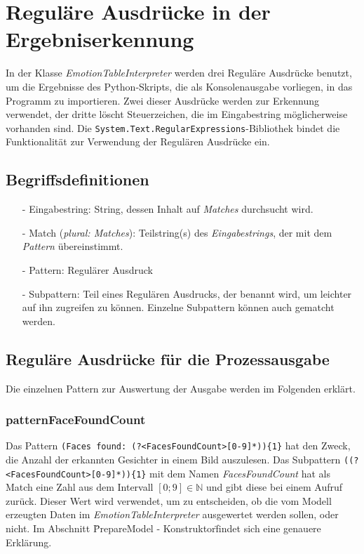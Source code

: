 \documentclass[10pt,a4paper]{report}
\begin{document}
\section{Reguläre Ausdrücke in der Ergebniserkennung}
In der Klasse \textit{EmotionTableInterpreter} werden drei Reguläre Ausdrücke benutzt, um die Ergebnisse des Python-Skripts, die als Konsolenausgabe vorliegen, in das Programm zu importieren. Zwei dieser Ausdrücke werden zur Erkennung verwendet, der dritte löscht Steuerzeichen, die im Eingabestring möglicherweise vorhanden sind. Die \texttt{System.Text.RegularExpressions}-Bibliothek bindet die Funktionalität zur Verwendung der Regulären Ausdrücke ein.
\subsection{Begriffsdefinitionen}
\begin{itemize}
\item[-] Eingabestring: String, dessen Inhalt auf \textit{Matches} durchsucht wird.
\item[-] Match (\textit{plural: Matches}): Teilstring(s) des \textit{Eingabestrings}, der mit dem \textit{Pattern} übereinstimmt.
\item[-] Pattern: Regulärer Ausdruck
\item[-] Subpattern: Teil eines Regulären Ausdrucks, der benannt wird, um leichter auf ihn zugreifen zu können. Einzelne Subpattern können auch gematcht werden. 
\end{itemize}
\subsection{Reguläre Ausdrücke für die Prozessausgabe}
Die einzelnen Pattern zur Auswertung der Ausgabe werden im Folgenden erklärt.
\subsubsection{patternFaceFoundCount}
Das Pattern \texttt{(Faces found:  (?<FacesFoundCount>[0-9]*))\{1\}} hat den Zweck, die Anzahl der erkannten Gesichter in einem Bild auszulesen. Das Subpattern \texttt{((?<FacesFoundCount>[0-9]*))\{1\}} mit dem Namen \textit{FacesFoundCount} hat als Match eine Zahl aus dem Intervall $\left[0;9\right] \in \mathbb{N}$ und gibt diese bei einem Aufruf zurück. Dieser Wert wird verwendet, um zu entscheiden, ob die vom Modell erzeugten Daten im \textit{EmotionTableInterpreter} ausgewertet werden sollen, oder nicht. Im Abschnitt \"PrepareModel - Konstruktor\" findet sich eine genauere Erklärung.
\end{document}
